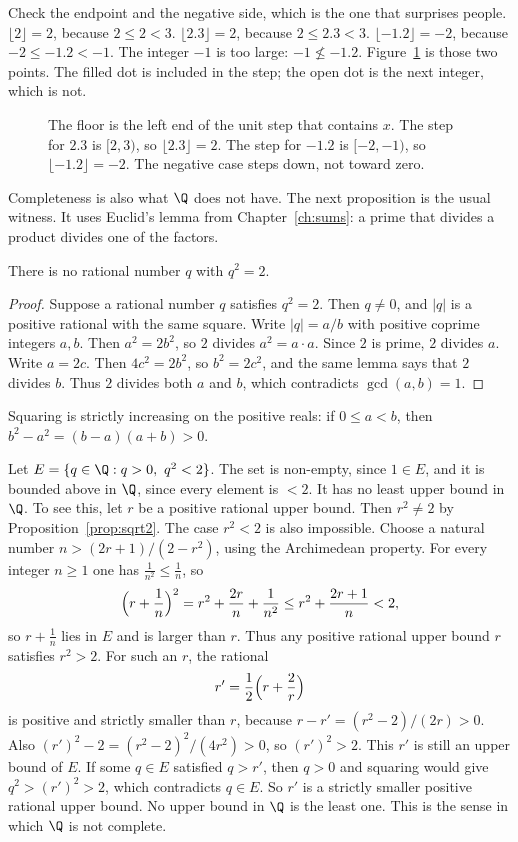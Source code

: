 Check the endpoint and the negative side, which is the one that surprises people. $\lfloor 2\rfloor=2$, because $2\le2<3$. $\lfloor2.3\rfloor=2$, because $2\le2.3<3$. $\lfloor-1.2\rfloor=-2$, because $-2\le-1.2<-1$. The integer $-1$ is too large: $-1\not\le-1.2$. Figure~\ref{fig:floor} is those two points. The filled dot is included in the step; the open dot is the next integer, which is not.

\begin{figure}[ht]
\centering
{}
\caption{The floor is the left end of the unit step that contains $x$. The step for $2.3$ is $[2,3)$, so $\lfloor2.3\rfloor=2$. The step for $-1.2$ is $[-2,-1)$, so $\lfloor-1.2\rfloor=-2$. The negative case steps down, not toward zero.}
\label{fig:floor}
\end{figure}

Completeness is also what $\Q$ does not have. The next proposition is the usual witness. It uses Euclid's lemma from Chapter~\ref{ch:sums}: a prime that divides a product divides one of the factors.

\begin{proposition}\label{prop:sqrt2}
There is no rational number $q$ with $q^2=2$.
\end{proposition}
\begin{proof}
Suppose a rational number $q$ satisfies $q^2=2$. Then $q\ne0$, and $|q|$ is a positive rational with the same square. Write $|q|=a/b$ with positive coprime integers $a,b$. Then $a^2=2b^2$, so $2$ divides $a^2=a\cdot a$. Since $2$ is prime, $2$ divides $a$. Write $a=2c$. Then $4c^2=2b^2$, so $b^2=2c^2$, and the same lemma says that $2$ divides $b$. Thus $2$ divides both $a$ and $b$, which contradicts $\gcd(a,b)=1$.
\end{proof}

Squaring is strictly increasing on the positive reals: if $0\le a<b$, then $b^2-a^2=(b-a)(a+b)>0$.

Let $E=\{q\in\Q:q>0,\ q^2<2\}$. The set is non-empty, since $1\in E$, and it is bounded above in $\Q$, since every element is $<2$. It has no least upper bound in $\Q$. To see this, let $r$ be a positive rational upper bound. Then $r^2\ne2$ by Proposition~\ref{prop:sqrt2}. The case $r^2<2$ is also impossible. Choose a natural number $n>(2r+1)/(2-r^2)$, using the Archimedean property. For every integer $n\ge1$ one has $\frac1{n^2}\le\frac1n$, so
\[
\Bigl(r+\frac1n\Bigr)^2=r^2+\frac{2r}n+\frac1{n^2}\le r^2+\frac{2r+1}n<2,
\]
so $r+\frac1n$ lies in $E$ and is larger than $r$. Thus any positive rational upper bound $r$ satisfies $r^2>2$. For such an $r$, the rational
\[
r'=\frac12\Bigl(r+\frac2r\Bigr)
\]
is positive and strictly smaller than $r$, because $r-r'=(r^2-2)/(2r)>0$. Also $(r')^2-2=(r^2-2)^2/(4r^2)>0$, so $(r')^2>2$. This $r'$ is still an upper bound of $E$. If some $q\in E$ satisfied $q>r'$, then $q>0$ and squaring would give $q^2>(r')^2>2$, which contradicts $q\in E$. So $r'$ is a strictly smaller positive rational upper bound. No upper bound in $\Q$ is the least one. This is the sense in which $\Q$ is not complete.


